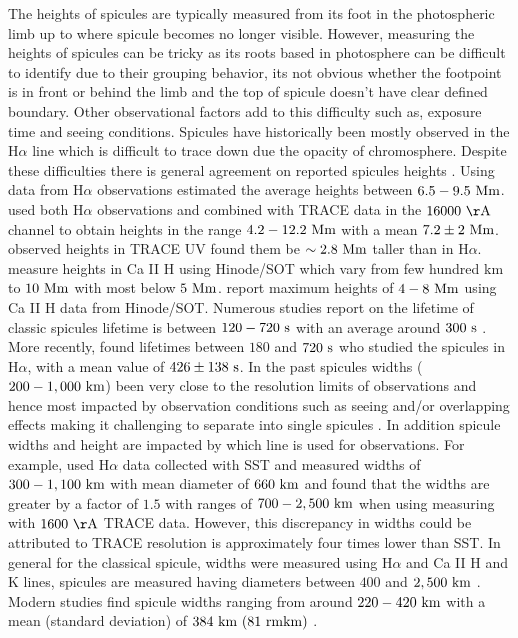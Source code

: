 \documentclass[12pt]{ociamthesis}
\newcommand{\np}{\\ \\}
\begin{document}
%
The heights of spicules are typically measured from its foot in the photospheric limb up to where spicule becomes no longer visible. However, measuring the heights of spicules can be tricky as its roots based in photosphere can be difficult to identify due to their grouping behavior, its not obvious whether the footpoint is in front or behind the limb and the top of spicule doesn't have clear defined boundary. Other observational factors add to this difficulty such as, exposure time and seeing conditions. Spicules have historically been mostly observed in the H$\alpha$ line which is difficult to trace down due the opacity of chromosphere. Despite these difficulties there is general agreement on reported spicules heights \citep{Tsiropoula2012}. Using data from H$\alpha$ observations \cite{Beckers1972ARA&A,Beckers1968} estimated the average heights between $6.5-9.5~\rm{Mm}$. \cite{Pasachoff2009SoPh26059P} used both H$\alpha$ observations and combined with TRACE data in the $16000~\rm{ \AA}$ channel to obtain heights in the range $4.2-12.2~\rm{Mm}$ with a mean $7.2\pm2~\rm{Mm}$. \cite{Pasachoff2009SoPh26059P} observed heights in TRACE UV found them be $\sim 2.8~\rm{Mm}$ taller than in H$\alpha$. \cite{Pontieu2007PASJ} measure heights in Ca II H using Hinode/SOT which vary from few hundred km to $10~\rm{Mm}$ with most below $5~\rm{Mm}$. \cite{Pereira2012} report maximum heights of $4-8~\rm{Mm}$ using Ca II H data from Hinode/SOT. Numerous studies report on the lifetime of classic spicules lifetime is between $120-720~\rm{s}$ with an average around $300~\rm{s}$ \citep{Roberts1945ApJ,Rush1954AuJPh7230R, Lippincott1957SCoA215L, Alissandrakis1971SoPh2047A, Cook1984AdSpR459C, Georgakilas1999AA341610G}. More recently, \cite{Pasachoff2009SoPh26059P} found lifetimes between $180$ and $720~\rm{s}$ who studied the spicules in H$\alpha$, with a mean value of $426\pm138~\rm{s}$.
% 
In the past spicules widths ($200-1,000~\rm{km}$) been very close to the resolution limits of observations and hence most impacted by observation conditions such as seeing and/or overlapping effects making it challenging to separate into single spicules \citep{Pontieu2007ASPC, Tsiropoula2012}. In addition spicule widths and height are impacted by which line is used for observations. For example, \cite{Pasachoff2009SoPh26059P} used H$\alpha$ data collected with SST and measured widths of $300-1,100~\rm{km}$ with mean diameter of $660~\rm{km}$ and found that the widths are greater by a factor of $1.5$ with ranges of $700-2,500~\rm{km}$ when using measuring with $1600~\rm{\AA}$ TRACE data. However, this discrepancy in widths could be attributed to TRACE resolution is approximately four times lower than SST. In general for the classical spicule, widths were measured using H$\alpha$ and Ca II H and K lines, spicules are measured having diameters between $400$ and $2,500~\rm{km}$ \cite{Beckers1968, Dunn1960Obs8031D, Beckers1972ARA&A, Lynch1973SoPh3063L}. Modern studies find spicule widths ranging from around $220-420~\rm{km}$ with a mean (standard deviation) of $384~\rm{km}~(81~rm{km})$ \cite{Pereira2012}. \np
\end{document}
